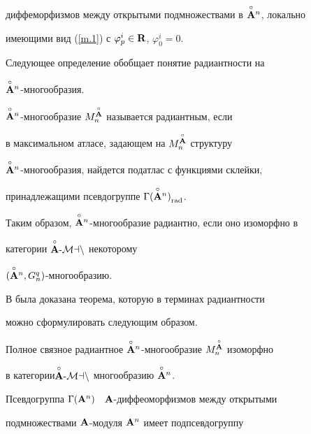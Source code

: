 диффеморфизмов между открытыми подмножествами в $\overset{\circ}{\bold A}{}^n$, локально


имеющими вид (\ref{m.1}) с $\varphi^i_p\in{\bold R}$, $\varphi^i_0=0$.


Следующее определение обобщает понятие радиантности на


$\overset{\circ}{\bold A}{}^n$-многообразия.








\begin{defn}


$\overset{\circ}{\bold A}{}^n$-многообразие $M^{\overset{\circ}{\bold A}{}}_n$ называется радиантным, если


в максимальном атласе, задающем на $M^{\overset{\circ}{\bold A}{}}_n$ структуру


$\overset{\circ}{\bold A}{}^n$-многообразия, найдется податлас с функциями склейки,


принадлежащими псевдогруппе ${\Gamma(\overset{\circ}{\bold A}{}^n)}_{\operatorname{rad}}$.


\end{defn}








Таким образом, $\overset{\circ}{\bold A}{}^n$-многообразие радиантно, если оно изоморфно в


категории ${\overset{\circ}{\bold A}{}}\text{-}\cal M an$ некоторому


$(\overset{\circ}{\bold A}{}^n,G^q_n)$-многообразию.





В \cite{VSh17} была доказана теорема, которую в терминах радиантности


можно сформулировать следующим образом.








\begin{thm}


Полное связное радиантное $\overset{\circ}{\bold A}{}^n$-многообразие $M^{\overset{\circ}{\bold A}{}}_n$ изоморфно


в категории\linebreak ${\overset{\circ}{\bold A}{}}\text{-}\cal M an$ многообразию $\overset{\circ}{\bold A}{}^n$.


\end{thm}





Псевдогруппа $\Gamma({\bold A}^n)$ \ ${\bold A}$-диффеоморфизмов между открытыми


подмножествами ${\bold A}$-модуля ${\bold A}^n$ имеет подпсевдогруппу


